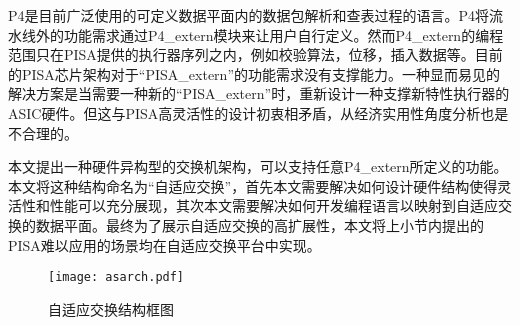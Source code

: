 






 \label{chap43}

P4是目前广泛使用的可定义数据平面内的数据包解析和查表过程的语言。P4将流水线外的功能需求通过P4\_extern模块来让用户自行定义。然而P4\_extern的编程范围只在PISA提供的执行器序列之内，例如校验算法，位移，插入数据等。目前的PISA芯片架构对于“PISA\_extern”的功能需求没有支撑能力。一种显而易见的解决方案是当需要一种新的“PISA\_extern”时，重新设计一种支撑新特性执行器的ASIC硬件。但这与PISA高灵活性的设计初衷相矛盾，从经济实用性角度分析也是不合理的。

本文提出一种硬件异构型的交换机架构，可以支持任意P4\_extern所定义的功能。本文将这种结构命名为“自适应交换”，首先本文需要解决如何设计硬件结构使得灵活性和性能可以充分展现，其次本文需要解决如何开发编程语言以映射到自适应交换的数据平面。最终为了展示自适应交换的高扩展性，本文将上小节内提出的PISA难以应用的场景均在自适应交换平台中实现。

\label{chap431}

\begin{figure}[!ht]
	\centering 
	\vspace{-1.5mm} 
	\texttt{[image: asarch.pdf]}
	\caption{自适应交换结构框图} \label{fig:asarch}\vspace{ 1.5mm} 
\end{figure}

